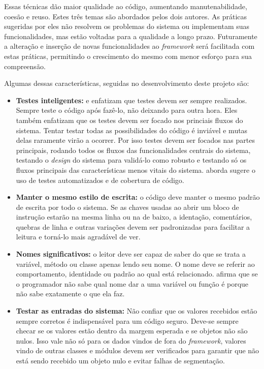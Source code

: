 Essas técnicas dão maior qualidade ao código, aumentando manutenabilidade, coesão e reuso. Estes três temas são abordados pelos dois autores. As práticas sugeridas por eles não resolvem os problemas do sistema ou implementam suas funcionalidades, mas estão voltadas para a qualidade a longo prazo. Futuramente a alteração e inserção de novas funcionalidades ao \textit{framework} será facilitada com estas práticas, permitindo o crescimento do mesmo com menor esforço para sua compreensão.

Algumas dessas características, seguidas no desenvolvimento deste projeto são:

\begin{itemize}
  \item \textbf{Testes inteligentes:} \cite{Goodliffe2007} e \cite{McConnel2004} enfatizam que testes devem ser sempre realizados. Sempre teste o código após fazê-lo, não deixando para outra hora. Eles também enfatizam que os testes devem ser focado nos princiais fluxos do sistema. Tentar testar todas as possibilidades do código é inviável e mutas delas raramente virão a ocorrer. Por isso testes devem ser focados nas partes principais, rodando todos os fluxos das funcionalidades centrais do sistema, testando o \textit{design} do sistema para validá-lo como robusto e testando só os fluxos principais das características menos vitais do sistema. \cite{McConnel2004} aborda sugere o uso de testes automatizados e de cobertura de código.
  \item \textbf{Manter o mesmo estilo de escrita:} o código deve manter o mesmo padrão de escrita por todo o sistema. Se as chaves usadas ao abrir um bloco de instrução estarão na mesma linha ou na de baixo, a identação, comentários, quebras de linha e outras variações devem ser padronizadas para facilitar a leitura e torná-lo mais agradável de ver.
  \item \textbf{Nomes significativos:} o leitor deve ser capaz de saber do que se trata a variável, método ou classe apenas lendo seu nome. O nome deve se referir ao comportamento, identidade ou padrão ao qual está relacionado. \cite{Goodliffe2007} afirma que se o programador não sabe qual nome dar a uma variável ou função é porque não sabe exatamente o que ela faz.
  \item \textbf{Testar as entradas do sistema:} Não confiar que os valores recebidos estão sempre corretos é indispensável para um código seguro. Deve-se sempre checar se os valores estão dentro da margem esperada e se objetos não são nulos. Isso vale não só para os dados vindos de fora do \textit{framework}, valores vindo de outras classes e módulos devem ser verificados para garantir que não está sendo recebido um objeto nulo e evitar falhas de segmentação.

\end{itemize}
